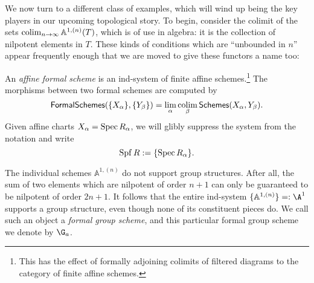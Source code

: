 We now turn to a different class of examples, which will wind up being the key players in our upcoming topological story.  To begin, consider the colimit of the sets $\operatorname*{colim}_{n \to \infty} \mathbb A^{1,(n)}(T)$, which is of use in algebra: it is the collection of nilpotent elements in $T$.  These kinds of conditions which are ``unbounded in $n$'' appear frequently enough that we are moved to give these functors a name too:
\begin{definition}
An \textit{affine formal scheme} is an ind-system of finite affine schemes.\footnote{This has the effect of formally adjoining colimits of filtered diagrams to the category of finite affine schemes.}  The morphisms between two formal schemes are computed by \[\mathsf{FormalSchemes}(\{X_\alpha\}, \{Y_\beta\}) = \lim_\alpha \operatorname*{colim}_\beta \mathsf{Schemes}(X_\alpha, Y_\beta).\]  Given affine charts $X_\alpha = \operatorname{Spec} R_\alpha$, we will glibly suppress the system from the notation and write \[\operatorname{Spf} R := \{\operatorname{Spec} R_\alpha\}.\]
\end{definition}

\begin{example}\label{FormalGaExample}
The individual schemes $\mathbb A^{1, (n)}$ do not support group structures.  After all, the sum of two elements which are nilpotent of order $n+1$ can only be guaranteed to be nilpotent of order $2n+1$.  It follows that the entire ind-system $\{\mathbb A^{1, (n)}\} =: \A^1$ supports a group structure, even though none of its constituent pieces do.  We call such an object a \textit{formal group scheme}, and this particular formal group scheme we denote by $\G_a$.
\end{example}

